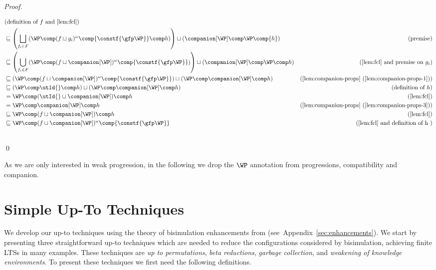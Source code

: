 \begin{proof}
\begin{enumerate}
\begin{align*}
        &\text{(definition of $f$ and \cref{lem:fcl})}
        \\&
        \sqsubseteq
        \left(\bigsqcup_{f_i\in F}(\WP\comp(f\sqcup g_i)^\omega\comp{\constf{\gfp\WP}}\comp h)\right)
        \sqcup (\companion[\WP]\comp\WP\comp{h})
        &\text{(premise)}
        \\&
        \sqsubseteq
        \left(\bigcup_{f_i\in F}(\WP\comp(f\sqcup \companion[\WP])^\omega\comp{\constf{\gfp\WP}})\right)
        \sqcup (\companion[\WP]\comp\WP\comp h)
        &\text{(\cref{lem:fcl} and premise on $g_i$)}
        \\&
        \sqsubseteq
        (\WP\comp(f\sqcup \companion[\WP])^\omega\comp{\constf{\gfp\WP}}) \sqcup (\WP\comp\companion[\WP]\comp h) 
        &\text{(\cref{lem:companion-props}~(\ref{lem:companion-props-1}))}
        \\&
        \sqsubseteq
        (\WP\comp\utId{}\comp h) \sqcup (\WP\comp\companion[\WP]\comp h) 
        &\text{(definition of $h$)}
        \\&
        =
        \WP\comp(\utId{}\sqcup\companion[\WP])\comp h
        &\text{(\cref{lem:fcl})}
        \\&
        = \WP\comp\companion[\WP]\comp h
        &\text{(\cref{lem:companion-props}~(\ref{lem:companion-props-3}))}
        \\&
        \sqsubseteq
        \WP\comp(f\sqcup\companion[\WP])\comp h
        &\text{(\cref{lem:fcl})}
        \\&
        \sqsubseteq
        \WP\comp(f\sqcup\companion[\WP])^\omega\comp {\constf{\gfp\WP}}
        &\text{(\cref{lem:fcl} and definition of h )}
         \\&&
        \qedhere
      \end{align*}
  \end{enumerate}\qed
\end{proof}



As we are only interested in weak progression, in the following we drop the $\WP$ annotation from progressions, compatibility and companion.


\section{Simple Up-To Techniques}\label{app:simple}
We develop our up-to techniques using the theory of bisimulation enhancements from \cite{PousS11,PousCompanion} (see~Appendix~\ref{sec:enhancements}).
%
We start by presenting three straightforward up-to techniques which are needed to reduce the configurations considered by bisimulation, achieving finite LTSs in many examples.
These techniques are \emph{up to permutations}, \emph{beta reductions}, \emph{garbage collection}, and \emph{weakening of knowledge environments}.
To present these techniques we first need the following definitions.

